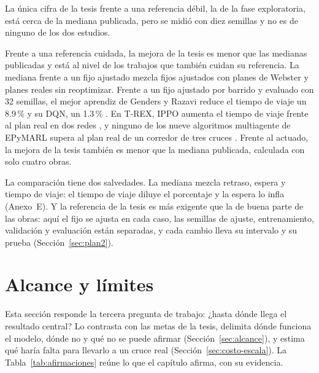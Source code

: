 La única cifra de la tesis frente a una referencia débil, la de la fase
exploratoria, está cerca de la mediana publicada, pero se midió con diez
semillas y no es de ninguno de los dos estudios.

Frente a una referencia cuidada, la mejora de la tesis es menor que las
medianas publicadas y está al nivel de los trabajos que también cuidan
su referencia. La mediana frente a un fijo ajustado mezcla fijos
ajustados con planes de Webster y planes reales sin reoptimizar. Frente
a un fijo ajustado por barrido y evaluado con 32 semillas, el mejor
aprendiz de Genders y Razavi reduce el tiempo de viaje un 8.9\,\% y su
DQN, un 1.3\,\% \citep{Genders2019_Framework}. En T-REX, IPPO aumenta el
tiempo de viaje frente al plan real en dos redes \citep{Nguyen2025_TREX},
y ninguno de los nueve algoritmos multiagente de EPyMARL supera al plan
real de un corredor de tres cruces \citep{Ault2022_EPyMARL}. Frente al
actuado, la mejora de la tesis también es menor que la mediana
publicada, calculada con solo cuatro obras.

La comparación tiene dos salvedades. La mediana mezcla retraso, espera y
tiempo de viaje: el tiempo de viaje diluye el porcentaje y la espera lo
infla (Anexo~E). Y la referencia de la tesis es más exigente que la de
buena parte de las obras: aquí el fijo se ajusta en cada caso, las
semillas de ajuste, entrenamiento, validación y evaluación están
separadas, y cada cambio lleva su intervalo y su prueba
(Sección~\ref{sec:plan2}).

\section{Alcance y límites}
\label{sec:plan-conclusion}
\suppressfloats[t]

Esta sección responde la tercera pregunta de trabajo: ¿hasta dónde llega
el resultado central? Lo contrasta con las metas de la tesis, delimita
dónde funciona el modelo, dónde no y qué no se puede afirmar
(Sección~\ref{sec:alcance}), y estima qué haría falta para llevarlo a
un cruce real (Sección~\ref{sec:costo-escala}). La
Tabla~\ref{tab:afirmaciones} reúne lo que el capítulo afirma, con su
evidencia.

